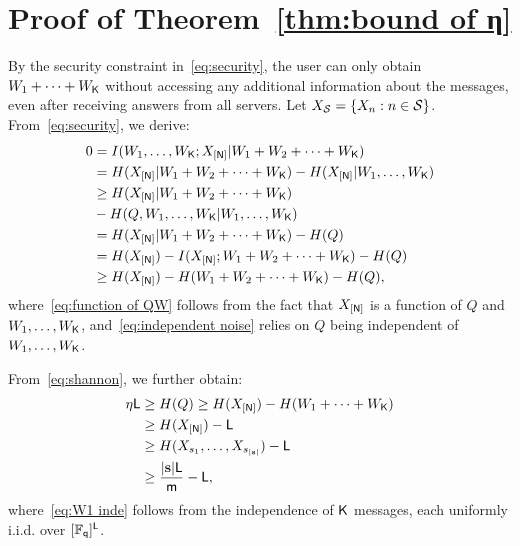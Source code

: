 \documentclass[conference,letterpaper]{IEEEtran}
\begin{document}
\section{Proof of Theorem~\ref{thm:bound of η}}
\label{sec:bound proof}
By the security constraint in~\eqref{eq:security}, the user can only obtain $W_1+\cdots+W_{{\sf K}}$ without accessing any additional information about the messages, even after receiving answers from all servers. Let $X_{{\cal S}}=\{X_n: n \in {\cal S}\}$. From~\eqref{eq:security}, we derive:
\begin{subequations}
\begin{align}
0 &= I(W_1, \ldots, W_{{\sf K}}; X_{[{\sf N}]} | W_1+W_2+\cdots+W_{{\sf K}}) \\
  &= H(X_{[{\sf N}]} | W_1+W_2+\cdots+W_{{\sf K}}) - H(X_{[{\sf N}]} | W_1, \ldots, W_{{\sf K}}) \\
  &\geq H(X_{[{\sf N}]} | W_1+W_2+\cdots+W_{{\sf K}}) \nonumber\\
  &- H(Q, W_1, \ldots, W_{{\sf K}} | W_1, \ldots, W_{{\sf K}}) \label{eq:function of QW} \\
  &= H(X_{[{\sf N}]} | W_1+W_2+\cdots+W_{{\sf K}}) - H(Q) \label{eq:independent noise} \\
  &= H(X_{[{\sf N}]}) - I(X_{[{\sf N}]}; W_1+W_2+\cdots+W_{{\sf K}}) - H(Q) \\
  &\geq H(X_{[{\sf N}]}) - H(W_1+W_2+\cdots+W_{{\sf K}}) - H(Q), \label{eq:shannon}
\end{align}
\end{subequations}
where~\eqref{eq:function of QW} follows from the fact that $X_{[{\sf N}]}$ is a function of $Q$ and $W_1, \ldots, W_{{\sf K}}$, and~\eqref{eq:independent noise} relies on $Q$ being independent of $W_1, \ldots, W_{{\sf K}}$.

From~\eqref{eq:shannon}, we further obtain:
\begin{subequations}
\begin{align}
\eta {\sf L} &\geq H(Q) \geq H(X_{[{\sf N}]}) - H(W_1+\cdots+W_{{\sf K}}) \\
          &\geq H(X_{[{\sf N}]}) - {\sf L} \label{eq:W1 inde} \\
          &\geq H(X_{s_1}, \ldots, X_{s_{|{\bf s}|}}) - {\sf L} \\
          &\geq  \frac{|{\bf s}|{\sf L}}{{\sf m}} - {\sf L}, \label{eq:lemma converse all term}
\end{align}
\end{subequations}
where~\eqref{eq:W1 inde} follows from the independence of ${\sf K}$ messages, each uniformly i.i.d. over $[\mathbb{F}_{{\sf q}}]^{{\sf L}}$. %
\end{document}
